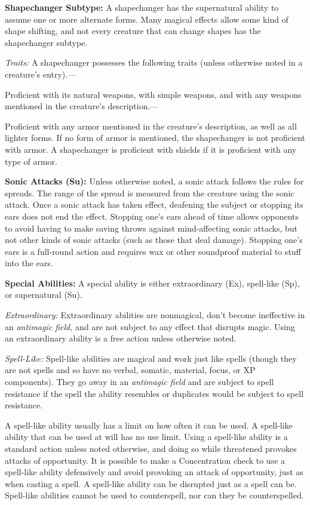 \documentclass{article}
\begin{document}
\vspace{12pt}
\textbf{Shapechanger Subtype:} A shapechanger has the supernatural ability to assume 
one or more alternate forms. Many magical effects allow some kind of shape shifting, 
and not every creature that can change shapes has the shapechanger subtype. 

\textit{Traits: }A shapechanger possesses the following traits (unless otherwise 
noted in a creature's entry).---

Proficient with its natural weapons, with simple weapons, and with any weapons 
mentioned in the creature's description.---

Proficient with any armor mentioned in the creature's description, as well as all 
lighter forms. If no form of armor is mentioned, the shapechanger is not proficient 
with armor. A shapechanger is proficient with shields if it is proficient with 
any type of armor.

\vspace{12pt}
\textbf{Sonic Attacks (Su):} Unless otherwise noted, a sonic attack follows the 
rules for spreads. The range of the spread is measured from the creature using 
the sonic attack. Once a sonic attack has taken effect, deafening the subject or 
stopping its ears does not end the effect. Stopping one's ears ahead of time allows 
opponents to avoid having to make saving throws against mind-affecting sonic attacks, 
but not other kinds of sonic attacks (such as those that deal damage). Stopping 
one's ears is a full-round action and requires wax or other soundproof material 
to stuff into the ears.

\vspace{12pt}
\textbf{Special Abilities:} A special ability is either extraordinary (Ex), spell-like 
(Sp), or supernatural (Su).

\textit{Extraordinary: }Extraordinary abilities are nonmagical, don't become ineffective 
in an \textit{antimagic field, }and are not subject to any effect that disrupts 
magic. Using an extraordinary ability is a free action unless otherwise noted.

\textit{Spell-Like: }Spell-like abilities are magical and work just like spells 
(though they are not spells and so have no verbal, somatic, material, focus, or 
XP components). They go away in an \textit{antimagic field }and are subject to 
spell resistance if the spell the ability resembles or duplicates would be subject 
to spell resistance.

A spell-like ability usually has a limit on how often it can be used. A spell-like 
ability that can be used at will has no use limit. Using a spell-like ability is 
a standard action unless noted otherwise, and doing so while threatened provokes 
attacks of opportunity. It is possible to make a Concentration check to use a spell-like 
ability defensively and avoid provoking an attack of opportunity, just as when 
casting a spell. A spell-like ability can be disrupted just as a spell can be. 
Spell-like abilities cannot be used to counterspell, nor can they be counterspelled.
\end{document}

